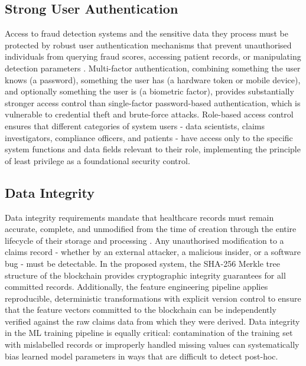 \subsection{Strong User Authentication}

Access to fraud detection systems and the sensitive data they process must be protected by robust user authentication mechanisms that prevent unauthorised individuals from querying fraud scores, accessing patient records, or manipulating detection parameters \cite{yoo2015}. Multi-factor authentication, combining something the user knows (a password), something the user has (a hardware token or mobile device), and optionally something the user is (a biometric factor), provides substantially stronger access control than single-factor password-based authentication, which is vulnerable to credential theft and brute-force attacks. Role-based access control ensures that different categories of system users - data scientists, claims investigators, compliance officers, and patients - have access only to the specific system functions and data fields relevant to their role, implementing the principle of least privilege as a foundational security control.

\subsection{Data Integrity}

Data integrity requirements mandate that healthcare records must remain accurate, complete, and unmodified from the time of creation through the entire lifecycle of their storage and processing \cite{abdallah2016}. Any unauthorised modification to a claims record - whether by an external attacker, a malicious insider, or a software bug - must be detectable. In the proposed system, the SHA-256 Merkle tree structure of the blockchain provides cryptographic integrity guarantees for all committed records. Additionally, the feature engineering pipeline applies reproducible, deterministic transformations with explicit version control to ensure that the feature vectors committed to the blockchain can be independently verified against the raw claims data from which they were derived. Data integrity in the ML training pipeline is equally critical: contamination of the training set with mislabelled records or improperly handled missing values can systematically bias learned model parameters in ways that are difficult to detect post-hoc.

